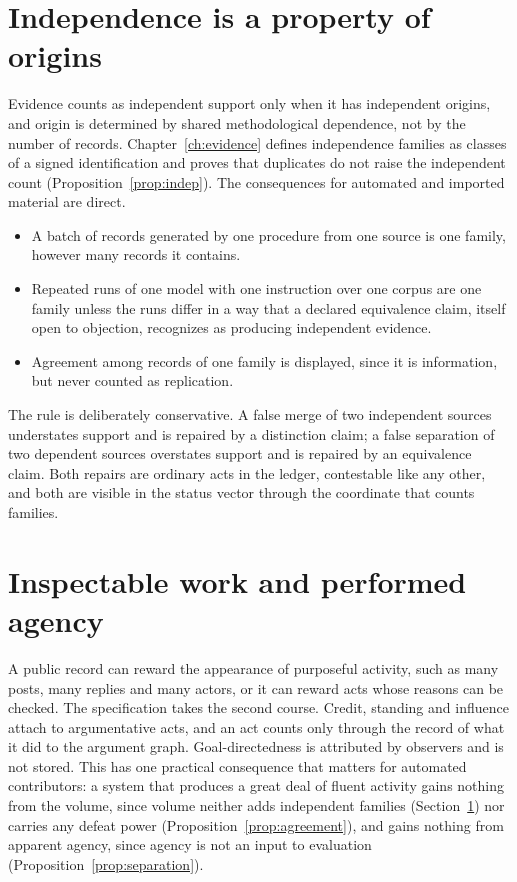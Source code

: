 \section{Independence is a property of origins}\label{sec:originindep}

Evidence counts as independent support only when it has independent origins, and origin is determined by shared methodological dependence, not by the number of records. Chapter~\ref{ch:evidence} defines independence families as classes of a signed identification and proves that duplicates do not raise the independent count (Proposition~\ref{prop:indep}). The consequences for automated and imported material are direct.
\begin{itemize}
\item A batch of records generated by one procedure from one source is one family, however many records it contains.
\item Repeated runs of one model with one instruction over one corpus are one family unless the runs differ in a way that a declared equivalence claim, itself open to objection, recognizes as producing independent evidence.
\item Agreement among records of one family is displayed, since it is information, but never counted as replication.
\end{itemize}
The rule is deliberately conservative. A false merge of two independent sources understates support and is repaired by a distinction claim; a false separation of two dependent sources overstates support and is repaired by an equivalence claim. Both repairs are ordinary acts in the ledger, contestable like any other, and both are visible in the status vector through the coordinate that counts families.

\section{Inspectable work and performed agency}\label{sec:inspectable}

A public record can reward the appearance of purposeful activity, such as many posts, many replies and many actors, or it can reward acts whose reasons can be checked. The specification takes the second course. Credit, standing and influence attach to argumentative acts, and an act counts only through the record of what it did to the argument graph. Goal-directedness is attributed by observers and is not stored. This has one practical consequence that matters for automated contributors: a system that produces a great deal of fluent activity gains nothing from the volume, since volume neither adds independent families (Section~\ref{sec:originindep}) nor carries any defeat power (Proposition~\ref{prop:agreement}), and gains nothing from apparent agency, since agency is not an input to evaluation (Proposition~\ref{prop:separation}).

